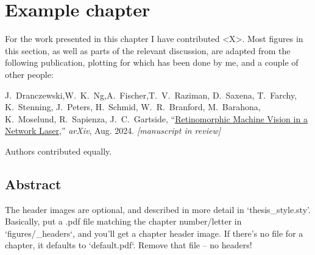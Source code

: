 \chapter{Example chapter}
\label{ch:example}

\begin{originality}
	For the work presented in this chapter I have contributed <X>.
	Most figures in this section, as well as parts of the relevant discussion, are adapted from the following publication, plotting for which has been done by me, and a couple of other people:

	J.~Dranczewski,\footnotemark[1] W.~K.~Ng,\footnotemark[1] A.~Fischer,\footnotemark[1] T.~V.~Raziman, D.~Saxena, T.~Farchy, K.~Stenning, J.~Peters, H.~Schmid, W.~R.~Branford, M.~Barahona, K.~Moselund, R.~Sapienza, J.~C.~Gartside, ``\href{https://doi.org/10.48550/arXiv.2407.15558}{Retinomorphic Machine Vision in a Network Laser},'' \textit{arXiv}, Aug. 2024. \textit{[manuscript in review]}
\end{originality}

\vspace{-1.5em}
{\footnotesize*Authors contributed equally.}

\section*{Abstract}
The header images are optional, and described in more detail in `thesis\_style.sty'. Basically, put a .pdf file matching the chapter number/letter in `figures/\_headers`, and you'll get a chapter header image. If there's no file for a chapter, it defaults to `default.pdf`. Remove that file -- no headers!

\lipsum[1]

